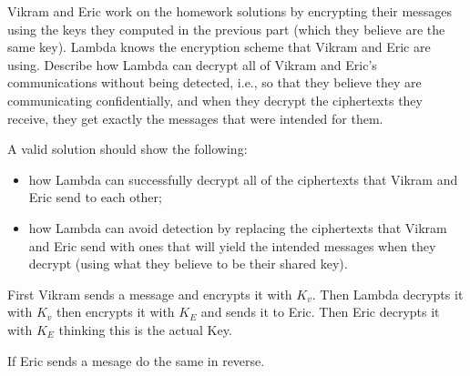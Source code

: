 \documentclass[12pt, letterpaper]{article}
\begin{document}
\begin{subproblem}{}
    Vikram and Eric work on the homework solutions by encrypting their messages using the keys they computed in the previous part (which they believe are the same key).
    Lambda knows the encryption scheme that Vikram and Eric are using.
    Describe how Lambda can decrypt all of Vikram and Eric's communications without being detected, i.e., so that they believe they are communicating confidentially, and when they decrypt the ciphertexts they receive, they get exactly the messages that were intended for them.

    A valid solution should show the following:
    \begin{itemize}
    \item how Lambda can successfully decrypt all of the ciphertexts that Vikram and Eric send to each other;
    \item how Lambda can avoid detection by replacing the ciphertexts that Vikram and Eric send with ones that will yield the intended messages when they decrypt (using what they believe to be their shared key).
    \end{itemize}
\end{subproblem}
\begin{problemproof}
    First Vikram sends a message and encrypts it with $K_v$. Then Lambda decrypts it with $K_v$ then encrypts it with $K_E$ and sends it to Eric. Then Eric decrypts it with $K_E$ thinking this is the actual Key.

    If Eric sends a mesage do the same in reverse.
\end{problemproof}
\newcommand{\BPP}{\textsc{BPP}}
\begin{problem}{}
    
\end{problem}
\end{document}
